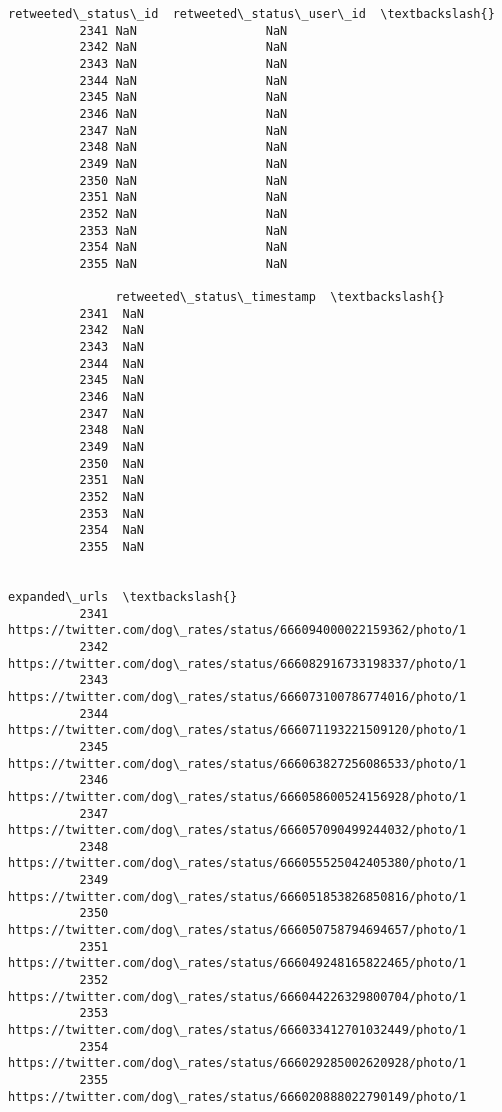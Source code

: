 \documentclass[11pt]{article}
\begin{document}
\begin{Verbatim}[commandchars=\\\{\}]
                retweeted\_status\_id  retweeted\_status\_user\_id  \textbackslash{}
          2341 NaN                  NaN                         
          2342 NaN                  NaN                         
          2343 NaN                  NaN                         
          2344 NaN                  NaN                         
          2345 NaN                  NaN                         
          2346 NaN                  NaN                         
          2347 NaN                  NaN                         
          2348 NaN                  NaN                         
          2349 NaN                  NaN                         
          2350 NaN                  NaN                         
          2351 NaN                  NaN                         
          2352 NaN                  NaN                         
          2353 NaN                  NaN                         
          2354 NaN                  NaN                         
          2355 NaN                  NaN                         
          
               retweeted\_status\_timestamp  \textbackslash{}
          2341  NaN                         
          2342  NaN                         
          2343  NaN                         
          2344  NaN                         
          2345  NaN                         
          2346  NaN                         
          2347  NaN                         
          2348  NaN                         
          2349  NaN                         
          2350  NaN                         
          2351  NaN                         
          2352  NaN                         
          2353  NaN                         
          2354  NaN                         
          2355  NaN                         
          
                                                                  expanded\_urls  \textbackslash{}
          2341  https://twitter.com/dog\_rates/status/666094000022159362/photo/1   
          2342  https://twitter.com/dog\_rates/status/666082916733198337/photo/1   
          2343  https://twitter.com/dog\_rates/status/666073100786774016/photo/1   
          2344  https://twitter.com/dog\_rates/status/666071193221509120/photo/1   
          2345  https://twitter.com/dog\_rates/status/666063827256086533/photo/1   
          2346  https://twitter.com/dog\_rates/status/666058600524156928/photo/1   
          2347  https://twitter.com/dog\_rates/status/666057090499244032/photo/1   
          2348  https://twitter.com/dog\_rates/status/666055525042405380/photo/1   
          2349  https://twitter.com/dog\_rates/status/666051853826850816/photo/1   
          2350  https://twitter.com/dog\_rates/status/666050758794694657/photo/1   
          2351  https://twitter.com/dog\_rates/status/666049248165822465/photo/1   
          2352  https://twitter.com/dog\_rates/status/666044226329800704/photo/1   
          2353  https://twitter.com/dog\_rates/status/666033412701032449/photo/1   
          2354  https://twitter.com/dog\_rates/status/666029285002620928/photo/1   
          2355  https://twitter.com/dog\_rates/status/666020888022790149/photo/1   
          

\end{Verbatim}
\end{document}
